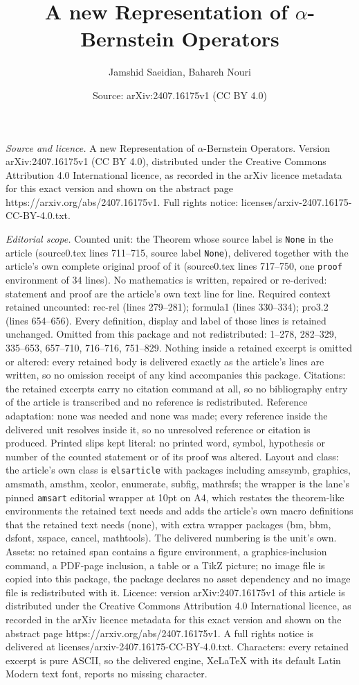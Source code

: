 \documentclass[10pt,a4paper]{amsart}
\title[A new Representation of $\alpha$-Bernstein Operators]{A new Representation of $\alpha$-Bernstein Operators}
\author{Jamshid Saeidian, Bahareh Nouri}
\date{Source: arXiv:2407.16175v1 (CC BY 4.0)}
\begin{document}
\maketitle

\noindent\emph{Source and licence.} A new Representation of $\alpha$-Bernstein Operators. Version arXiv:2407.16175v1 (CC BY 4.0), distributed under the Creative Commons Attribution 4.0 International licence, as recorded in the arXiv licence metadata for this exact version and shown on the abstract page https://arxiv.org/abs/2407.16175v1. Full rights notice: licenses/arxiv-2407.16175-CC-BY-4.0.txt.\par\smallskip

\noindent\textit{Editorial scope.} Counted unit: the Theorem whose source label is \texttt{None} in the article (source0.tex lines 711--715, source label \texttt{None}), delivered together with the article's own complete original proof of it (source0.tex lines 717--750, one \texttt{proof} environment of 34 lines). No mathematics is written, repaired or re-derived: statement and proof are the article's own text line for line. Required context retained uncounted: rec-rel (lines 279--281); formula1 (lines 330--334); pro3.2 (lines 654--656). Every definition, display and label of those lines is retained unchanged. Omitted from this package and not redistributed: 1--278, 282--329, 335--653, 657--710, 716--716, 751--829. Nothing inside a retained excerpt is omitted or altered: every retained body is delivered exactly as the article's lines are written, so no omission receipt of any kind accompanies this package. Citations: the retained excerpts carry no citation command at all, so no bibliography entry of the article is transcribed and no reference is redistributed. Reference adaptation: none was needed and none was made; every reference inside the delivered unit resolves inside it, so no unresolved reference or citation is produced. Printed slips kept literal: no printed word, symbol, hypothesis or number of the counted statement or of its proof was altered. Layout and class: the article's own class is \texttt{elsarticle} with packages including amssymb, graphics, amsmath, amsthm, xcolor, enumerate, subfig, mathrsfs; the wrapper is the lane's pinned \texttt{amsart} editorial wrapper at 10pt on A4, which restates the theorem-like environments the retained text needs and adds the article's own macro definitions that the retained text needs (none), with extra wrapper packages (bm, bbm, dsfont, xspace, cancel, mathtools). The delivered numbering is the unit's own. Assets: no retained span contains a figure environment, a graphics-inclusion command, a PDF-page inclusion, a table or a TikZ picture; no image file is copied into this package, the package declares no asset dependency and no image file is redistributed with it. Licence: version arXiv:2407.16175v1 of this article is distributed under the Creative Commons Attribution 4.0 International licence, as recorded in the arXiv licence metadata for this exact version and shown on the abstract page https://arxiv.org/abs/2407.16175v1. A full rights notice is delivered at licenses/arxiv-2407.16175-CC-BY-4.0.txt. Characters: every retained excerpt is pure ASCII, so the delivered engine, XeLaTeX with its default Latin Modern text font, reports no missing character.
\end{document}
